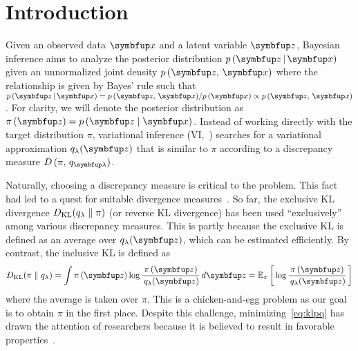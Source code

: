 
\section{Introduction}
Given an observed data \(\vx\) and a latent variable \(\vz\), Bayesian inference aims to analyze the posterior distribution \(p\,(\vz\,|\,\vx)\) given an unnormalized joint density \(p\,(\vz,\,\vx)\) where the relationship is given by Bayes' rule such that \(p\,(\vz\,|\,\vx) = {p\,(\vz,\,\vx)}/{p\,(\vx)} \propto p\,(\vz,\,\vx)\).
For clarity, we will denote the posterior distribution as \(\pi\left(\vz\right) = p\,(\vz\mid\vx)\).
Instead of working directly with the target distribution \(\pi\), variational inference (VI,~\citealt{blei_variational_2017}) searches for a variational approximation \(q_{\lambda}(\vz)\) that is similar to \(\pi\) according to a discrepancy measure \(D\,(\pi,\, q_{\vlambda})\).

Naturally, choosing a discrepancy measure is critical to the problem.
This fact had led to a quest for suitable divergence measures~\citep{pmlr-v37-salimans15, NIPS2016_7750ca35, NIPS2017_35464c84, NEURIPS2018_1cd138d0, pmlr-v97-ruiz19a}.
So far, the exclusive KL divergence \(D_{\mathrm{KL}}(q_{\lambda}\parallel\pi)\) (or reverse KL divergence) has been used ``exclusively'' among various discrepancy measures.
This is partly because the exclusive KL is defined as an average over \(q_{\lambda}(\vz)\), which can be estimated efficiently.
By contrast, the inclusive KL is defined as
%
{\small
\vspace{-0.05in}
\begin{align}
  \DKL{\pi}{q_{\lambda}}
  = \int \pi\,(\vz) \log \frac{\pi\left(\vz\right)}{\,q_{\lambda}(\vz)} \,d\vz
  = \Esub{\pi}{\log \frac{\pi\left(\vz\right)}{\,q_{\lambda}(\vz)} } \label{eq:klpq}
\end{align}
}%
%
where the average is taken over \(\pi\). 
This is a chicken-and-egg problem as our goal is to obtain \(\pi\) in the first place.
Despite this challenge, minimizing~\eqref{eq:klpq} has drawn the attention of researchers because it is believed to result in favorable properties~\citep{minka2005divergence, mackay_local_2001}.


